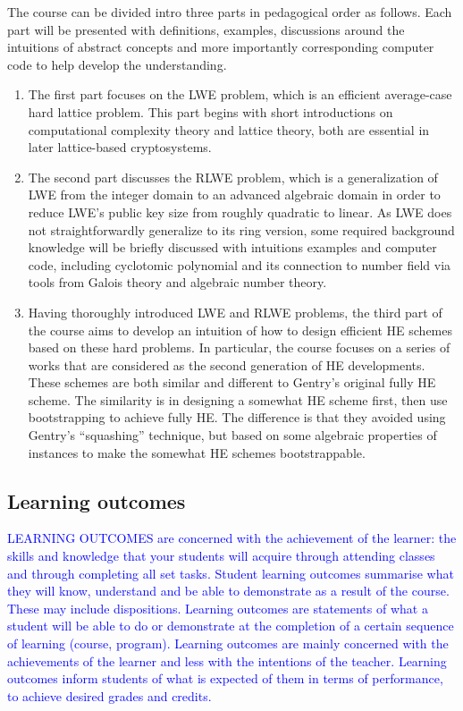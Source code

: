 \documentclass[../main.tex]{subfiles}
\begin{document}
The course can be divided intro three parts in pedagogical order as follows. Each part will be presented with definitions, examples, discussions around the intuitions of abstract concepts and more importantly corresponding computer code to help develop the understanding. 
\begin{enumerate}
	\item The first part focuses on the LWE problem, which is an efficient average-case hard lattice problem. This part begins with short introductions on computational complexity theory and lattice theory, both are essential in later lattice-based cryptosystems.
	
	\item The second part discusses the RLWE problem, which is a generalization of LWE from the integer domain to an advanced algebraic domain in order to reduce LWE's public key size from roughly quadratic to linear. As LWE does not straightforwardly generalize to its ring version, some required background knowledge will be briefly discussed with intuitions examples and computer code, including cyclotomic polynomial and its connection to number field via tools from Galois theory and algebraic number theory. 
	
	\item Having thoroughly introduced LWE and RLWE problems, the third part of the course aims to develop an intuition of how to design efficient HE schemes based on these hard problems. In particular, the course focuses on a series of works that are considered as the second generation of HE developments. These schemes are both similar and different to Gentry's  original fully HE scheme. The similarity is in designing a somewhat HE scheme first, then use bootstrapping to achieve fully HE. The difference is that they avoided using Gentry's ``squashing'' technique, but based on some algebraic properties of instances to make the somewhat HE schemes bootstrappable.   
\end{enumerate}


\subsection{Learning outcomes}
\textcolor{blue}{LEARNING	OUTCOMES are	concerned	with	the	achievement	of	the	learner:	the	skills	and	knowledge	that	your	
students	will	acquire	through	attending	classes	and	through	completing	all	set	tasks.	Student	learning	
outcomes	summarise	what	they	will	know,	understand	and	be	able	to	demonstrate	as	a	result	of	the	course.
These	may	include	dispositions.
Learning outcomes are statements of what a student will be able to do or demonstrate
at the completion of a certain sequence of learning (course, program).
Learning outcomes are mainly concerned with the achievements of the learner and less
with the intentions of the teacher.
Learning outcomes inform students of what is expected of them in terms of performance,
to achieve desired grades and credits.}
\end{document}
